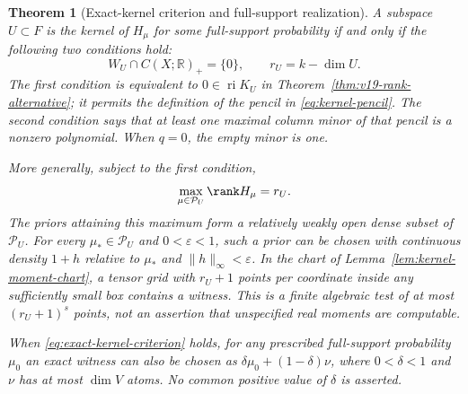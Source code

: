 \documentclass[11pt]{amsart}
\newtheorem{theorem}{Theorem}[section]
\theoremstyle{definition}\newtheorem{definition}[theorem]{Definition}
\theoremstyle{remark}\newtheorem{remark}[theorem]{Remark}
\newcommand{\R}{\mathbb R}\newcommand{\N}{\mathbb N}\newcommand{\C}{\mathbb C}
\begin{document}
\begin{theorem}[Exact-kernel criterion and full-support realization]
\label{thm:exact-kernel}
A subspace $U\subset F$ is the kernel of $H_\mu$ for some full-support
probability if and only if the following two conditions hold:
\begin{equation}\label{eq:exact-kernel-criterion}
 W_U\cap C(X;\R)_+=\{0\},\qquad r_U=k-\dim U.
\end{equation}
The first condition is equivalent to $0\in\operatorname{ri}K_U$ in
Theorem~\ref{thm:v19-rank-alternative}; it permits the definition of the
pencil in \eqref{eq:kernel-pencil}. The second condition says that at
least one maximal column minor of that pencil is a nonzero polynomial.
When $q=0$, the empty minor is one.

More generally, subject to the first condition,
\begin{equation}\label{eq:kernel-slice-max-rank}
 \max_{\mu\in\mathcal P_U}\rank H_\mu=r_U.
\end{equation}
The priors attaining this maximum form a relatively weakly open dense
subset of $\mathcal P_U$. For every $\mu_*\in\mathcal P_U$ and
$0<\varepsilon<1$, such a prior can be chosen with continuous density
$1+h$ relative to $\mu_*$ and $\|h\|_\infty<\varepsilon$.
In the chart of Lemma~\ref{lem:kernel-moment-chart}, a tensor grid with
$r_U+1$ points per coordinate inside any sufficiently small box contains
a witness. This is a finite algebraic test of at most $(r_U+1)^s$
points, not an assertion that unspecified real moments are computable.

When \eqref{eq:exact-kernel-criterion} holds, for any prescribed
full-support probability $\mu_0$ an exact witness can also be chosen as
$\delta\mu_0+(1-\delta)\nu$, where $0<\delta<1$ and $\nu$ has at
most $\dim V$ atoms. No common positive value of $\delta$ is asserted.
\end{theorem}
\end{document}
